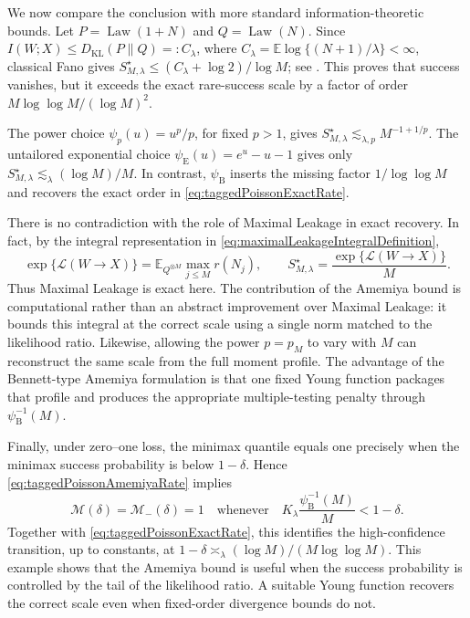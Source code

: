 \documentclass[11pt]{article}
\theoremstyle{definition}
\theoremstyle{remark}
\newcommand{\Ee}{\mathbb E}
\newcommand{\1}{\boldsymbol{1}}
\newcommand{\cM}{\mathcal M}
\newcommand{\ml}[2]{\mathcal{L}(#1\!\to\!#2)}
\begin{document}
We now compare the conclusion with more standard information-theoretic bounds. Let
\(P=\operatorname{Law}(1+N)\) and \(Q=\operatorname{Law}(N)\). Since
\(I(W;X)\le D_{\mathrm{KL}}(P\|Q)=:C_\lambda\), where
\(C_\lambda=\Ee\log\{(N+1)/\lambda\}<\infty\), classical Fano gives
\(S_{M,\lambda}^\star\le(C_\lambda+\log2)/\log M\); see
\cite[Chapter~7]{CoverThomas2006}. This proves that success vanishes, but it
exceeds the exact rare-success scale by a factor of order
\(M\log\log M/(\log M)^2\).

The power choice \(\psi_p(u)=u^p/p\), for fixed \(p>1\), gives
\(S_{M,\lambda}^\star\lesssim_{\lambda,p}M^{-1+1/p}\). The untailored
exponential choice \(\psi_{\mathrm E}(u)=e^u-u-1\) gives only
\(S_{M,\lambda}^\star\lesssim_\lambda(\log M)/M\). In contrast,
\(\psi_{\mathrm B}\) inserts the missing factor \(1/\log\log M\) and
recovers the exact order in \eqref{eq:taggedPoissonExactRate}.

There is no contradiction with the role of Maximal Leakage in exact
recovery. In fact, by the integral representation in
\eqref{eq:maximalLeakageIntegralDefinition},
\begin{equation}
\exp\{\ml{W}{X}\}
=
\Ee_{Q^{\otimes M}}\max_{j\le M}r(N_j),
\qquad
S_{M,\lambda}^\star
=
\frac{\exp\{\ml{W}{X}\}}{M}.
\label{eq:taggedPoissonLeakageIdentity}
\end{equation}
Thus Maximal Leakage is exact here. The contribution of the
Amemiya bound is computational rather than an abstract improvement
over Maximal Leakage: it bounds this integral at the correct scale using a
single norm matched to the likelihood ratio. Likewise, allowing the power
\(p=p_M\) to vary with \(M\) can reconstruct the same scale from the full
moment profile. The advantage of the Bennett-type Amemiya
formulation is that one fixed Young function packages that profile and
produces the appropriate multiple-testing penalty through
\(\psi_{\mathrm B}^{-1}(M)\).

Finally, under zero--one loss, the minimax quantile equals one precisely when
the minimax success probability is below \(1-\delta\). Hence
\eqref{eq:taggedPoissonAmemiyaRate} implies
\[
\cM(\delta)=\cM_-(\delta)=1
\quad\text{whenever}\quad
K_\lambda\frac{\psi_{\mathrm B}^{-1}(M)}{M}<1-\delta.
\]
Together with \eqref{eq:taggedPoissonExactRate}, this identifies the
high-confidence transition, up to constants, at
\(1-\delta\asymp_\lambda(\log M)/(M\log\log M)\). This example shows that
the Amemiya bound is useful when the success probability is controlled by
the tail of the likelihood ratio. A suitable Young function recovers the
correct scale even when fixed-order divergence bounds do not.
\end{document}
